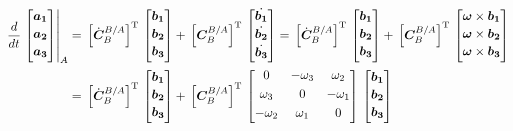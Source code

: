 \begin{align}{\label{eqn:C_B_Amatrix_timeDerivative}}
\begin{split}
\frac{d}{dt}
\left.
\begin{bmatrix}
\bm{a_1}\\[0.2em]
\bm{a_2}\\[0.2em]
\bm{a_3}\\[0.2em]
\end{bmatrix}
\right|_A &=\,
\Big[{\dot{\bm{C}}_B^{B/A}}\Big]^{\rm T}
\,
\begin{bmatrix}
\bm{b_1}\\[0.2em]
\bm{b_2}\\[0.2em]
\bm{b_3}\\[0.2em]
\end{bmatrix}
+\,
\Big[{\bm{C}_B^{B/A}}\Big]^{\rm T}
\,
\begin{bmatrix}
\dot{\bm{b_1}}\\[0.2em]
\dot{\bm{b_2}}\\[0.2em]
\dot{\bm{b_3}}\\[0.2em]
\end{bmatrix}
=\,
\Big[{\dot{\bm{C}}_B^{B/A}}\Big]^{\rm T}
\,
\begin{bmatrix}
\bm{b_1}\\[0.2em]
\bm{b_2}\\[0.2em]
\bm{b_3}\\[0.2em]
\end{bmatrix}
+\,
\Big[{\bm{C}_B^{B/A}}\Big]^{\rm T}
\,
\begin{bmatrix}
\bm{\omega} \times \bm{b_1}\\[0.2em]
\bm{\omega} \times \bm{b_2}\\[0.2em]
\bm{\omega} \times \bm{b_3}\\[0.2em]
\end{bmatrix}
\\
& =\,
\Big[{\dot{\bm{C}}_B^{B/A}}\Big]^{\rm T}
\,
\begin{bmatrix}
\bm{b_1}\\[0.2em]
\bm{b_2}\\[0.2em]
\bm{b_3}\\[0.2em]
\end{bmatrix}
+\,
\Big[{\bm{C}_B^{B/A}}\Big]^{\rm T}
\,
\begin{bmatrix}
0 & - \omega_3 & \omega_2 \\[0.3em]
\omega_3 & 0 & - \omega_1 \\[0.3em]
- \omega_2 & \omega_1 & 0\\[0.3em]
\end{bmatrix}
\,
\begin{bmatrix}
\bm{b_1}\\[0.2em]
\bm{b_2}\\[0.2em]
\bm{b_3}\\[0.2em]
\end{bmatrix}
\end{split}
\end{align}

